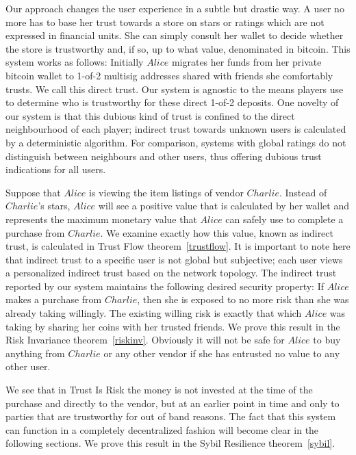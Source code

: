   Our approach changes the user experience in a subtle but drastic way. A user no more has to base her trust towards a store
  on stars or ratings which are not expressed in financial units. She can simply consult her wallet to decide whether the
  store is trustworthy and, if so, up to what value, denominated in bitcoin. This system works as follows: Initially $Alice$
  migrates her funds from her private bitcoin wallet to 1-of-2 multisig addresses shared with friends she comfortably trusts.
  We call this direct trust. Our system is agnostic to the means players use to determine who is trustworthy for these direct
  1-of-2 deposits. One novelty of our system is that this dubious kind of trust is confined to the direct neighbourhood of
  each player; indirect trust towards unknown users is calculated by a deterministic algorithm.  For comparison, systems with
  global ratings do not distinguish between neighbours and other users, thus offering dubious trust indications for all users.

  Suppose that $Alice$ is viewing the item listings of vendor $Charlie$. Instead of $Charlie$'s stars, $Alice$ will see a
  positive value that is calculated by her wallet and represents the maximum monetary value that $Alice$ can safely use to
  complete a purchase from $Charlie$. We examine exactly how this value, known as indirect trust, is calculated in Trust Flow
  theorem~\ref{trustflow}. It is important to note here that indirect trust to a specific user is not global but subjective;
  each user views a personalized indirect trust based on the network topology. The indirect trust reported by our system
  maintains the following desired security property: If $Alice$ makes a purchase from $Charlie$, then she is exposed to no
  more risk than she was already taking willingly. The existing willing risk is exactly that which $Alice$ was taking by
  sharing her coins with her trusted friends. We prove this result in the Risk Invariance theorem~\ref{riskinv}. Obviously it
  will not be safe for $Alice$ to buy anything from $Charlie$ or any other vendor if she has entrusted no value to any other
  user.

  We see that in Trust Is Risk the money is not invested at the time of the purchase and directly to the vendor, but at an
  earlier point in time and only to parties that are trustworthy for out of band reasons. The fact that this system can
  function in a completely decentralized fashion will become clear in the following sections. We prove this result in the
  Sybil Resilience theorem~\ref{sybil}.

